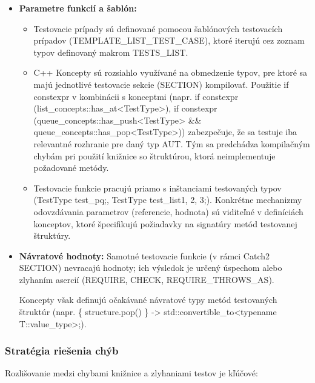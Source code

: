 \documentclass[11pt]{article}
\begin{document}
\begin{itemize}
  \item \textbf{Parametre funkcií a šablón:}
  \begin{itemize}
    \item Testovacie prípady sú definované pomocou šablónových testovacích prípadov (TEMPLATE\_LIST\_TEST\_CASE), ktoré iterujú cez zoznam typov definovaný makrom TESTS\_LIST.
    \item C++ Koncepty sú rozsiahlo využívané na obmedzenie typov, pre ktoré sa majú jednotlivé testovacie sekcie (SECTION) kompilovať. Použitie if constexpr v kombinácii s konceptmi (napr. if constexpr (list\_concepts::has\_at<TestType>), if constexpr (queue\_concepts::has\_push<TestType> \&\& queue\_concepts::has\_pop<TestType>)) zabezpečuje, že sa testuje iba relevantné rozhranie pre daný typ AUT. Tým sa predchádza kompilačným chybám pri použití knižnice so štruktúrou, ktorá neimplementuje požadované metódy.
    \item Testovacie funkcie pracujú priamo s inštanciami testovaných typov (TestType test\_pq;, TestType test\_list{1, 2, 3};). Konkrétne mechanizmy odovzdávania parametrov (referencie, hodnota) sú viditeľné v definíciách konceptov, ktoré špecifikujú požiadavky na signatúry metód testovanej štruktúry.
  \end{itemize}
  \item \textbf{Návratové hodnoty:} Samotné testovacie funkcie (v rámci Catch2 SECTION) nevracajú hodnoty; ich výsledok je určený úspechom alebo zlyhaním asercií (REQUIRE, CHECK, REQUIRE\_THROWS\_AS).

  Koncepty však definujú očakávané návratové typy metód testovaných štruktúr (napr. \{ structure.pop() \} -> std::convertible\_to<typename T::value\_type>;).
\end{itemize}

\subsubsection{Stratégia riešenia chýb}

Rozlišovanie medzi chybami knižnice a zlyhaniami testov je kľúčové:
\end{document}
